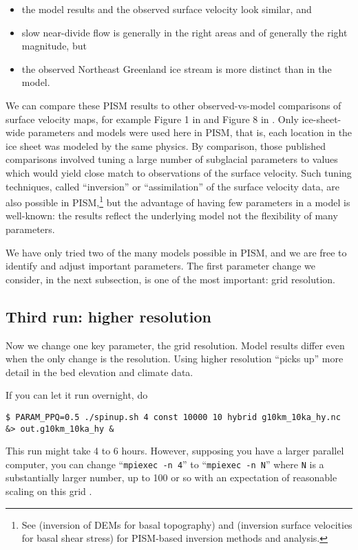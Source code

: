\begin{itemize}
\item the model results and the observed surface velocity look similar, and
\item slow near-divide flow is generally in the right areas and of generally the right magnitude, but
\item the observed Northeast Greenland ice stream is more distinct than in the model.
\end{itemize}

We can compare these PISM results to other observed-vs-model comparisons of surface velocity maps, for example Figure 1 in \cite{Priceetal2011} and Figure 8 in \cite{Larouretal2012}.  Only ice-sheet-wide parameters and models were used here in PISM, that is, each location in the ice sheet was modeled by the same physics.  By comparison, those published comparisons involved tuning a large number of subglacial parameters to values which would yield close match to observations of the surface velocity.  Such tuning techniques, called ``inversion'' or ``assimilation'' of the surface velocity data, are also possible in PISM,\footnote{See \cite{vanPeltetal2013} (inversion of DEMs for basal topography) and \cite{Habermannetal2013} (inversion surface velocities for basal shear stress) for PISM-based inversion methods and analysis.} but the advantage of having few parameters in a model is well-known: the results reflect the underlying model not the flexibility of many parameters.

We have only tried two of the many models possible in PISM, and we are free to identify and adjust important parameters.  The first parameter change we consider, in the next subsection, is one of the most important: grid resolution.


\subsection{Third run: higher resolution}  \label{subsect:higherresrun}

Now we change one key parameter, the grid resolution.  Model results differ even when the only change is the resolution.  Using higher resolution ``picks up'' more detail in the bed elevation and climate data.

If you can let it run overnight, do
\begin{verbatim}
$ PARAM_PPQ=0.5 ./spinup.sh 4 const 10000 10 hybrid g10km_10ka_hy.nc &> out.g10km_10ka_hy &
\end{verbatim}
This run might take 4 to 6 hours.  However, supposing you have a larger parallel computer, you can change ``\texttt{mpiexec -n 4}'' to ``\texttt{mpiexec -n N}'' where \texttt{N} is a substantially larger number, up to 100 or so with an expectation of reasonable scaling on this grid \cite{BBssasliding,DickensMorey2013}.

